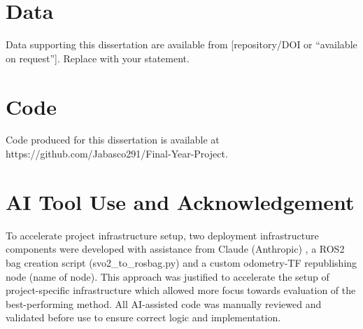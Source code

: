 
\section{Data}
Data supporting this dissertation are available from [repository/DOI or ``available on request'']. Replace with your statement.

\section{Code}
Code produced for this dissertation is available at https://github.com/Jabasco291/Final-Year-Project.

\section{AI Tool Use and Acknowledgement}\label{ai-use}

To accelerate project infrastructure setup, two deployment infrastructure components were developed with assistance from Claude (Anthropic) \cite{Claude2024}, a ROS2 bag creation script (svo2\_to\_rosbag.py) and a custom odometry-TF republishing node (name of node). This approach was justified to accelerate the setup of project-specific infrastructure which allowed more focus towards evaluation of the best-performing method. All AI-assisted code was manually reviewed and validated before use to ensure correct logic and implementation.

\mainmatter

